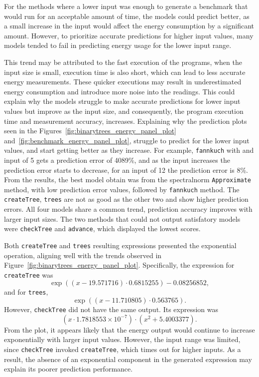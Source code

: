 For the methods where a lower input was enough to generate a benchmark that would run for an acceptable amount of time, the models could predict better, as a small increase in the input would affect the energy consumption by a significant amount. However, to prioritize accurate predictions for higher input values, many models tended to fail in predicting energy usage for the lower input range. 

This trend may be attributed to the fast execution of the programs, when the input size is small, execution time is also short, which can lead to less accurate energy measurements. These quicker executions may result in underestimated energy consumption and introduce more noise into the readings. This could explain why the models struggle to make accurate predictions for lower input values but improve as the input size, and consequently, the program execution time and measurement accuracy, increases. Explaining why the prediction plots seen in the Figures~\ref{fig:binarytrees_energy_panel_plot} and~\ref{fig:benchmark_energy_panel_plot}, struggle to predict for the lower input values, and start getting better as they increase. For example, \texttt{fannkuch} with and input of 5 gets a prediction error of 4089\%, and as the input increases the prediction error starts to decrease, for an input of 12 the prediction error is 8\%.
From the results, the best model obtain was from the spectralnorm \texttt{Approximate} method, with low prediction error values, followed by \texttt{fannkuch} method. The \texttt{createTree}, \texttt{trees} are not as good as the other two and show higher prediction errors. All four models share a common trend, prediction accuracy improves with larger input sizes. The two methods that could not output satisfatory models were \texttt{checkTree} and \texttt{advance}, which displayed the lowest scores.

Both \texttt{createTree} and \texttt{trees} resulting expressions presented the exponential operation, aligning well with the trends observed in Figure~\ref{fig:binarytrees_energy_panel_plot}. Specifically, the expression for \texttt{createTree} was  
\[
\exp\left((x - 19.571716) \cdot 0.6815255\right) - 0.08256852,
\]  
and for \texttt{trees},  
\[
\exp\left((x - 11.710805) \cdot 0.563765\right).
\]  
However, \texttt{checkTree} did not have the same output. Its expression was  
\[
(x \cdot 1.7818553 \times 10^{-7}) \cdot \left(x^2 + 5.4003377\right).
\]  
From the plot, it appears likely that the energy output would continue to increase exponentially with larger input values. However, the input range was limited, since \texttt{checkTree} invoked \texttt{createTree}, which times out for higher inputs. As a result, the absence of an exponential component in the generated expression may explain its poorer prediction performance.

